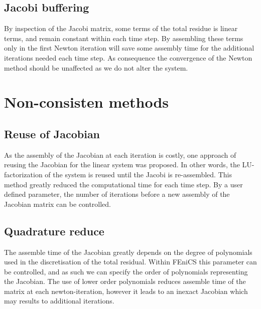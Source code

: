 \subsection{Jacobi buffering}
By inspection of the Jacobi matrix, some terms of the total residue is linear terms, and remain constant within each time step. By assembling these terms only in the first Newton iteration will save some assembly time for the additional iterations needed each time step. As consequence the convergence of the Newton method should be unaffected as we do not alter the system.  

\section{Non-consisten methods}    
\subsection{Reuse of Jacobian}
As the assembly of the Jacobian at each iteration is costly, one approach of reusing the Jacobian for the linear system was proposed. In other words, the LU-factorization of the system is reused until the Jacobi is re-assembled. This method greatly reduced the computational time for each time step. By a user defined parameter, the number of iterations before a new assembly of the Jacobian matrix can be controlled. 

\subsection{Quadrature reduce}
The assemble time of the Jacobian greatly depends on the degree of polynomials used in the discretisation of the total residual. Within FEniCS this parameter can be controlled, and as such we can specify the order of polynomials representing the Jacobian. The use of lower order polynomials reduces assemble time of the matrix at each newton-iteration, however it leads to an inexact Jacobian which may results to additional iterations. 


 




  